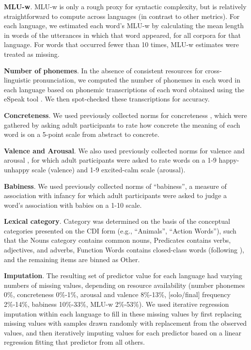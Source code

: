 \documentclass[
   11pt,
       ]{book}
\begin{document}
\textbf{MLU-w}. MLU-w is only a rough proxy for syntactic complexity, but is relatively straightforward to compute across languages (in contrast to other metrics). For each language, we estimated each word's MLU-w by calculating the mean length in words of the utterances in which that word appeared, for all corpora for that language. For words that occurred fewer than 10 times, MLU-w estimates were treated as missing.

\textbf{Number of phonemes}. In the absence of consistent resources for cross-linguistic pronunciation, we computed the number of phonemes in each word in each language based on phonemic transcriptions of each word obtained using the eSpeak tool \citep{duddington2012}. We then spot-checked these transcriptions for accuracy.

\textbf{Concreteness}. We used previously collected norms for concreteness \citep{brysbaert2014}, which were gathered by asking adult participants to rate how concrete the meaning of each word is on a 5-point scale from abstract to concrete.

\textbf{Valence and Arousal}. We also used previously collected norms for valence and arousal \citep{warriner2013}, for which adult participants were asked to rate words on a 1-9 happy-unhappy scale (valence) and 1-9 excited-calm scale (arousal).

\textbf{Babiness}. We used previously collected norms of ``babiness'', a measure of association with infancy \citep{perry2015} for which adult participants were asked to judge a word's association with babies on a 1-10 scale.

\textbf{Lexical category}. Category was determined on the basis of the conceptual categories presented on the CDI form (e.g., ``Animals'', ``Action Words''), such that the Nouns category contains common nouns, Predicates contains verbs, adjectives, and adverbs, Function Words contains closed-class words (following \citealp{bates1994}), and the remaining items are binned as Other.

\textbf{Imputation}. The resulting set of predictor value for each language had varying numbers of missing values, depending on resource availability (number phonemes 0\%, concreteness 0\%-1\%, arousal and valence 8\%-13\%, {[}solo/final{]} frequency 2\%-14\%, babiness 10\%-33\%, MLU-w 2\%-53\%). We used iterative regression imputation within each language to fill in these missing values by first replacing missing values with samples drawn randomly with replacement from the observed values, and then iteratively imputing values for each predictor based on a linear regression fitting that predictor from all others.
\end{document}
